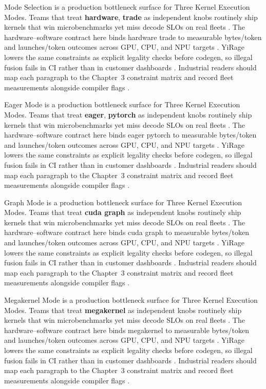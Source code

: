 Mode Selection is a production bottleneck surface for Three Kernel Execution Modes. Teams that treat \textbf{hardware}, \textbf{trade} as independent knobs routinely ship kernels that win microbenchmarks yet miss decode SLOs on real fleets \citep{nvidia2022hopper,amd2024aie}. The hardware--software contract here binds hardware trade to measurable bytes/token and launches/token outcomes across GPU, CPU, and NPU targets \citep{semianalysis2024tma,dlbook}. YiRage lowers the same constraints as explicit legality checks before codegen, so illegal fusion fails in CI rather than in customer dashboards \citep{amd2024xdna,dao2022flashattention}. Industrial readers should map each paragraph to the Chapter~3 constraint matrix and record fleet measurements alongside compiler flags \citep{amd2024aie,kwon2023vllm}.

Eager Mode is a production bottleneck surface for Three Kernel Execution Modes. Teams that treat \textbf{eager}, \textbf{pytorch} as independent knobs routinely ship kernels that win microbenchmarks yet miss decode SLOs on real fleets \citep{taxbreak2026,semianalysis2024tma}. The hardware--software contract here binds eager pytorch to measurable bytes/token and launches/token outcomes across GPU, CPU, and NPU targets \citep{memoryfloor2026,amd2024xdna}. YiRage lowers the same constraints as explicit legality checks before codegen, so illegal fusion fails in CI rather than in customer dashboards \citep{nvidia2022hopper,amd2024aie}. Industrial readers should map each paragraph to the Chapter~3 constraint matrix and record fleet measurements alongside compiler flags \citep{semianalysis2024tma,dlbook}.

Graph Mode is a production bottleneck surface for Three Kernel Execution Modes. Teams that treat \textbf{cuda graph} as independent knobs routinely ship kernels that win microbenchmarks yet miss decode SLOs on real fleets \citep{memoryfloor2026,amd2024xdna}. The hardware--software contract here binds cuda graph to measurable bytes/token and launches/token outcomes across GPU, CPU, and NPU targets \citep{nvidia2022hopper,amd2024aie}. YiRage lowers the same constraints as explicit legality checks before codegen, so illegal fusion fails in CI rather than in customer dashboards \citep{semianalysis2024tma,dlbook}. Industrial readers should map each paragraph to the Chapter~3 constraint matrix and record fleet measurements alongside compiler flags \citep{amd2024xdna,dao2022flashattention}.

Megakernel Mode is a production bottleneck surface for Three Kernel Execution Modes. Teams that treat \textbf{megakernel} as independent knobs routinely ship kernels that win microbenchmarks yet miss decode SLOs on real fleets \citep{nvidia2022hopper,amd2024aie}. The hardware--software contract here binds megakernel to measurable bytes/token and launches/token outcomes across GPU, CPU, and NPU targets \citep{semianalysis2024tma,dlbook}. YiRage lowers the same constraints as explicit legality checks before codegen, so illegal fusion fails in CI rather than in customer dashboards \citep{amd2024xdna,dao2022flashattention}. Industrial readers should map each paragraph to the Chapter~3 constraint matrix and record fleet measurements alongside compiler flags \citep{amd2024aie,kwon2023vllm}.


